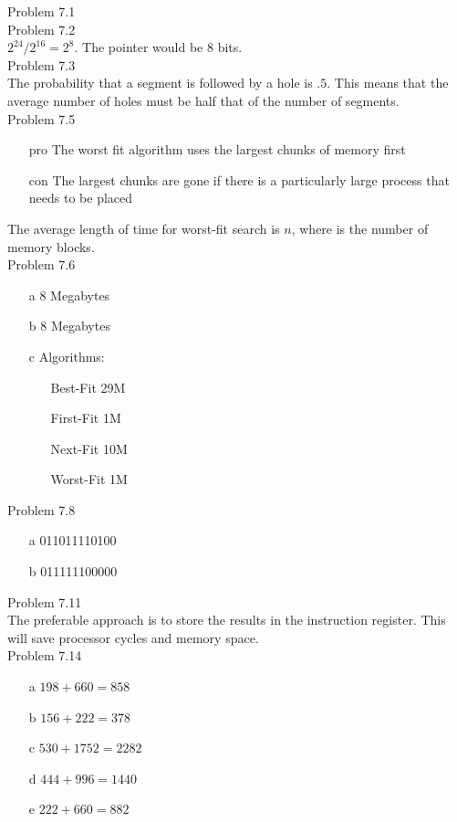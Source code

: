\documentclass[12pt]{amsart}
\begin{document}
Problem 7.1\\

Problem 7.2\\
$2^{24} / 2^{16} = 2^{8}$. The pointer would be 8 bits.\\

Problem 7.3\\
The probability that a segment is followed by a hole is $.5$. This means that the average number of holes must be half that of the number of segments.\\

Problem 7.5\\
\begin{enumerate}
\item[pro] The worst fit algorithm uses the largest chunks of memory first
\item[con] The largest chunks are gone if there is a particularly large process that needs to be placed
\end{enumerate}
The average length of time for worst-fit search is $n$, where is the number of memory blocks.\\

Problem 7.6\\
\begin{enumerate}
\item[a] 8 Megabytes 
\item[b] 8 Megabytes
\item[c] Algorithms: 
\begin{enumerate}
				\item[Best-Fit] 29M
				\item[First-Fit] 1M
				\item[Next-Fit] 10M
				\item[Worst-Fit] 1M
			\end{enumerate}
\end{enumerate}
Problem 7.8
\begin{enumerate}
\item[a] 011011110100
\item[b] 011111100000\\
\end{enumerate}
Problem 7.11\\
The preferable approach is to store the results in the instruction register. This will save processor cycles and memory space.\\

Problem 7.14\\
\begin{enumerate}
\item[a] $198 + 660 = 858$
\item[b] $156 + 222 = 378$
\item[c] $530 + 1752 = 2282$
\item[d] $444 + 996 = 1440$
\item[e] $222 + 660 = 882$
\end{enumerate}
\end{document}
